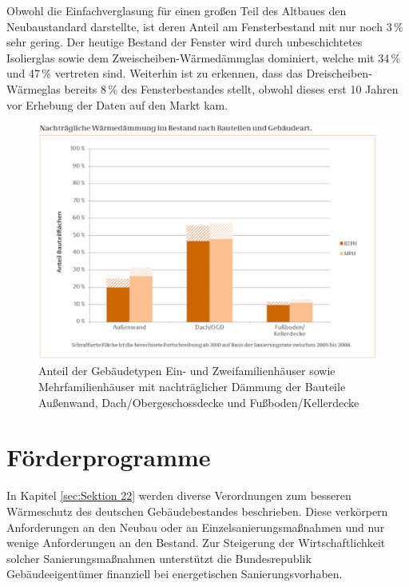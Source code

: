 Obwohl die Einfachverglasung für einen großen Teil des Altbaues den Neubaustandard darstellte, ist deren Anteil am Fensterbestand mit nur noch 3\,\% sehr gering. 
Der heutige Bestand der Fenster wird durch unbeschichtetes Isolierglas sowie dem Zweischeiben-Wärmedämmglas dominiert, welche mit 34\,\% und 47\,\% vertreten sind.
Weiterhin ist zu erkennen, dass das Dreischeiben-Wärmeglas bereits 8\,\% des Fensterbestandes stellt, obwohl dieses erst 10 Jahren vor Erhebung der Daten auf den Markt kam.

\begin{figure}[H]
	\centering
		\includegraphics{Pictures/NachtraeglicheSanierung.jpg}
	\caption{Anteil der Gebäudetypen Ein- und Zweifamilienhäuser sowie Mehrfamilienhäuser mit nachträglicher Dämmung der Bauteile Außenwand, Dach/Obergeschossdecke und Fußboden/Kellerdecke \cite{Bigalke.2016}}
	\label{fig: Abbildung231} 
\end{figure}


\section{Förderprogramme}
\label{sec:Sektion 24}

In Kapitel \ref{sec:Sektion 22} werden diverse Verordnungen zum besseren Wärmeschutz des deutschen Gebäudebestandes beschrieben.
Diese verkörpern Anforderungen an den Neubau oder an Einzelsanierungsmaßnahmen und nur wenige Anforderungen an den Bestand.
Zur Steigerung der Wirtschaftlichkeit solcher Sanierungsmaßnahmen unterstützt die Bundesrepublik Gebäudeeigentümer finanziell bei energetischen Sanierungsvorhaben.



